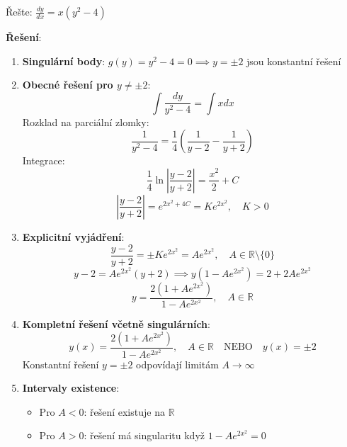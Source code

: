 \begin{example}
    Řešte: $\frac{dy}{dx} = x(y^2 - 4)$
    \vspace{0.3\baselineskip}
    
    \textbf{Řešení}: 
    \begin{enumerate}
    \item \textbf{Singulární body}: $g(y) = y^2 - 4 = 0 \implies y = \pm 2$ jsou konstantní řešení
    
    \item \textbf{Obecné řešení pro $y \neq \pm 2$}:
    \[
    \int \frac{dy}{y^2 - 4} = \int x  dx
    \]
    Rozklad na parciální zlomky:
    \[
    \frac{1}{y^2 - 4} = \frac{1}{4}\left(\frac{1}{y-2} - \frac{1}{y+2}\right)
    \]
    Integrace:
    \[
    \frac{1}{4} \ln\left|\frac{y-2}{y+2}\right| = \frac{x^2}{2} + C
    \]
    \[
    \left|\frac{y-2}{y+2}\right| = e^{2x^2 + 4C} = Ke^{2x^2}, \quad K > 0
    \]
    
    \item \textbf{Explicitní vyjádření}:
    \[
    \frac{y-2}{y+2} = \pm Ke^{2x^2} = Ae^{2x^2}, \quad A \in \mathbb{R}\setminus\{0\}
    \]
    \[
    y-2 = Ae^{2x^2}(y+2) \implies y(1 - Ae^{2x^2}) = 2 + 2Ae^{2x^2}
    \]
    \[
    y = \frac{2(1 + Ae^{2x^2})}{1 - Ae^{2x^2}}, \quad A \in \mathbb{R}
    \]
    
    \item \textbf{Kompletní řešení včetně singulárních}:
    \[
    y(x) = \frac{2(1 + Ae^{2x^2})}{1 - Ae^{2x^2}}, \quad A \in \mathbb{R} \quad \text{NEBO} \quad y(x) = \pm 2
    \]
    Konstantní řešení $y = \pm 2$ odpovídají limitám $A \to \infty$
    
    \item \textbf{Intervaly existence}: 
    \begin{itemize}
    \item Pro $A < 0$: řešení existuje na $\mathbb{R}$
    \item Pro $A > 0$: řešení má singularitu když $1 - Ae^{2x^2} = 0$
    \end{itemize}
    \end{enumerate}
    \end{example}

\vspace{0.6\baselineskip}

